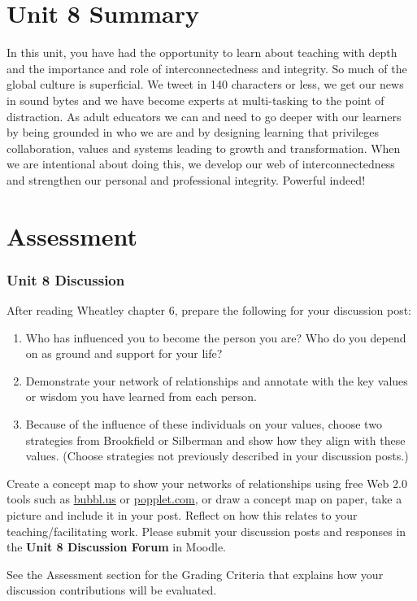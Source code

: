 \documentclass[
]{book}
\providecommand{\tightlist}{%
  \setlength{\itemsep}{0pt}\setlength{\parskip}{0pt}}
\begin{document}
\hypertarget{unit-8-summary}{%
\section*{Unit 8 Summary}\label{unit-8-summary}}

In this unit, you have had the opportunity to learn about teaching with depth and the importance and role of interconnectedness and integrity. So much of the global culture is superficial. We tweet in 140 characters or less, we get our news in sound bytes and we have become experts at multi-tasking to the point of distraction. As adult educators we can and need to go deeper with our learners by being grounded in who we are and by designing learning that privileges collaboration, values and systems leading to growth and transformation. When we are intentional about doing this, we develop our web of interconnectedness and strengthen our personal and professional integrity. Powerful indeed!

\hypertarget{assessment-7}{%
\section*{Assessment}\label{assessment-7}}

\begin{assessment}
\hypertarget{unit-8-discussion}{%
\subsubsection*{Unit 8 Discussion}\label{unit-8-discussion}}

After reading Wheatley chapter 6, prepare the following for your
discussion post:

\begin{enumerate}
\def\labelenumi{\alph{enumi})}
\tightlist
\item
  Who has influenced you to become the person you are? Who do you depend
  on as ground and support for your life?
\item
  Demonstrate your network of relationships and annotate with the key
  values or wisdom you have learned from each person.
\item
  Because of the influence of these individuals on your values, choose
  two strategies from Brookfield or Silberman and show how they align
  with these values. (Choose strategies not previously described in your
  discussion posts.)
\end{enumerate}

Create a concept map to show your networks of relationships using free
Web 2.0 tools such as \href{https://bubbl.us/}{bubbl.us} or
\href{http://popplet.com/}{popplet.com}, or draw a concept map on paper,
take a picture and include it in your post. Reflect on how this relates
to your teaching/facilitating work. Please submit your discussion posts
and responses in the \textbf{Unit 8 Discussion Forum} in Moodle.

See the Assessment section for the Grading Criteria that explains how
your discussion contributions will be evaluated.
\end{assessment}
\end{document}
